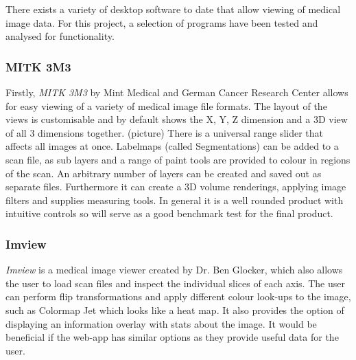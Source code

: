 \documentclass[a4paper,11pt,titlepage]{article}
\begin{document}
There exists a variety of desktop software to date that allow viewing of medical image data. For this project, a selection of programs have been tested and analysed for functionality.

\subsubsection{MITK 3M3}
     Firstly, \textit{MITK 3M3} by Mint Medical and German Cancer Research Center allows for easy viewing of a variety of medical image file formats. The layout of the views is customisable and by default shows the X, Y, Z dimension and a 3D view of all 3 dimensions together. (picture) There is a universal range slider that affects all images at once. Labelmaps (called Segmentations) can be added to a scan file, as sub layers and a range of paint tools are provided to colour in regions of the scan. An arbitrary number of layers can be created and saved out as separate files. 
     Furthermore it can create a 3D volume renderings, applying image filters and supplies measuring tools. In general it is a well rounded product with intuitive controls so will serve as a good benchmark test for the final product.

\subsubsection{Imview}
\textit{Imview} is a medical image viewer created by Dr. Ben Glocker, which also allows the user to load scan files and inspect the individual slices of each axis. The user can perform flip transformations and apply different colour look-ups to the image, such as Colormap Jet which looks like a heat map. It also provides the option of displaying an information overlay with stats about the image. It would be beneficial if the web-app has similar options as they provide useful data for the user.
\end{document}
